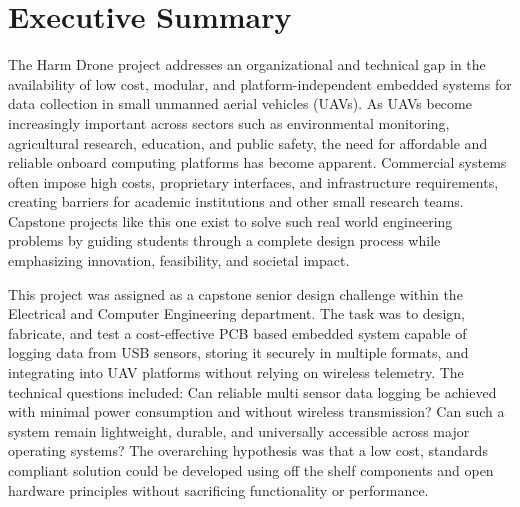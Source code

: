 \documentclass[12pt]{article}
\begin{document}
\newpage
\section*{Executive Summary}


\par The Harm Drone project addresses an organizational and technical gap in the availability of low cost, modular, and platform-independent embedded systems for data collection in small unmanned aerial vehicles (UAVs). As UAVs become increasingly important across sectors such as environmental monitoring, agricultural research, education, and public safety, the need for affordable and reliable onboard computing platforms has become apparent. Commercial systems often impose high costs, proprietary interfaces, and infrastructure requirements, creating barriers for academic institutions and other small research teams. Capstone projects like this one exist to solve such real world engineering problems by guiding students through a complete design process while emphasizing innovation, feasibility, and societal impact.

\par This project was assigned as a capstone senior design challenge within the Electrical and Computer Engineering department. The task was to design, fabricate, and test a cost-effective PCB based embedded system capable of logging data from USB sensors, storing it securely in multiple formats, and integrating into UAV platforms without relying on wireless telemetry. The technical questions included: Can reliable multi sensor data logging be achieved with minimal power consumption and without wireless transmission? Can such a system remain lightweight, durable, and universally accessible across major operating systems? The overarching hypothesis was that a low cost, standards compliant solution could be developed using off the shelf components and open hardware principles without sacrificing functionality or performance.
\end{document}
